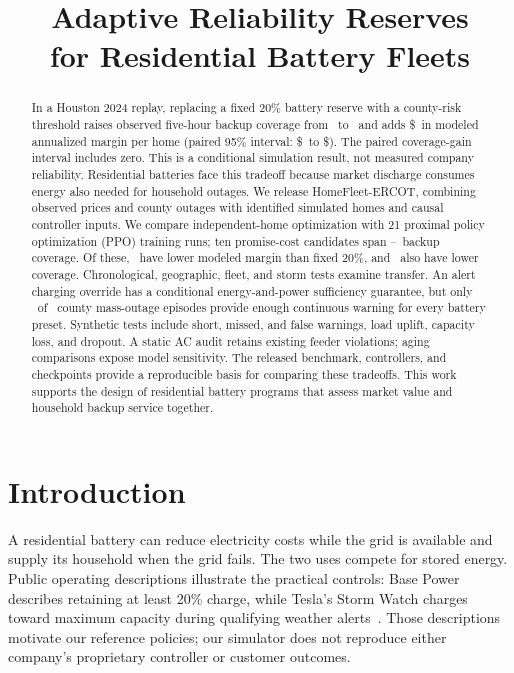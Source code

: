\documentclass{article}
\title{Adaptive Reliability Reserves\\for Residential Battery Fleets}
\begin{document}
\maketitle
\begin{abstract}
In a Houston 2024 replay, replacing a fixed 20\% battery reserve with a county-risk threshold raises observed five-hour backup coverage from \FixedPromise\ to \ThresholdPromise\ and adds \$\ThresholdGain\ in modeled annualized margin per home (paired 95\% interval: \$\ThresholdLow\ to \$\ThresholdHigh). The paired coverage-gain interval includes zero. This is a conditional simulation result, not measured company reliability. Residential batteries face this tradeoff because market discharge consumes energy also needed for household outages. We release HomeFleet-ERCOT, combining observed prices and county outages with identified simulated homes and causal controller inputs. We compare independent-home optimization with 21 proximal policy optimization (PPO) training runs; ten promise-cost candidates span \PromiseSeedLow--\PromiseSeedHigh\ backup coverage. Of these, \PromiseNegativeMarginCount\ have lower modeled margin than fixed 20\%, and \PromiseBelowFixedCount\ also have lower coverage. Chronological, geographic, fleet, and storm tests examine transfer. An alert charging override has a conditional energy-and-power sufficiency guarantee, but only \AlertLeadCoverage\ of \MassEvents\ county mass-outage episodes provide enough continuous warning for every battery preset. Synthetic tests include short, missed, and false warnings, load uplift, capacity loss, and dropout. A static AC audit retains existing feeder violations; aging comparisons expose model sensitivity. The released benchmark, controllers, and checkpoints provide a reproducible basis for comparing these tradeoffs. This work supports the design of residential battery programs that assess market value and household backup service together.
\end{abstract}

\section{Introduction}

A residential battery can reduce electricity costs while the grid is available and supply its household when the grid fails. The two uses compete for stored energy. Public operating descriptions illustrate the practical controls: Base Power describes retaining at least 20\% charge, while Tesla's Storm Watch charges toward maximum capacity during qualifying weather alerts~\citep{basecharge2026,teslastormwatch}. Those descriptions motivate our reference policies; our simulator does not reproduce either company's proprietary controller or customer outcomes.
\end{document}
